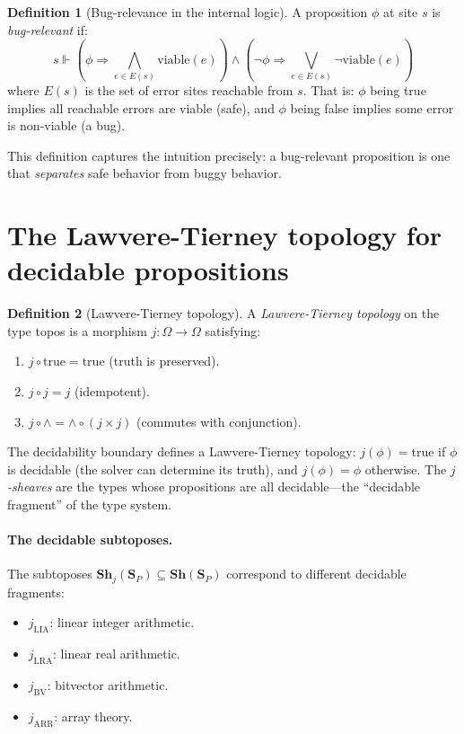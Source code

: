 \documentclass[11pt]{report}
\theoremstyle{definition}
\newtheorem{definition}{Definition}[section]
\theoremstyle{plain}
\begin{document}
\begin{definition}[Bug-relevance in the internal logic]
A proposition $\phi$ at site $s$ is \emph{bug-relevant} if:
\[
  s \Vdash \left(\phi \Rightarrow \bigwedge_{e \in E(s)}
    \mathrm{viable}(e)\right) \wedge \left(\neg\phi \Rightarrow
    \bigvee_{e \in E(s)} \neg\mathrm{viable}(e)\right)
\]
where $E(s)$ is the set of error sites reachable from $s$. That is: $\phi$
being true implies all reachable errors are viable (safe), and $\phi$ being
false implies some error is non-viable (a bug).
\end{definition}

This definition captures the intuition precisely: a bug-relevant proposition
is one that \emph{separates} safe behavior from buggy behavior.

\section{The Lawvere-Tierney topology for decidable propositions}

\begin{definition}[Lawvere-Tierney topology]
A \emph{Lawvere-Tierney topology} on the type topos is a morphism
$j : \Omega \to \Omega$ satisfying:
\begin{enumerate}[nosep]
  \item $j \circ \mathrm{true} = \mathrm{true}$ (truth is preserved).
  \item $j \circ j = j$ (idempotent).
  \item $j \circ \wedge = \wedge \circ (j \times j)$ (commutes with
        conjunction).
\end{enumerate}
\end{definition}

The decidability boundary defines a Lawvere-Tierney topology: $j(\phi) =
\mathrm{true}$ if $\phi$ is decidable (the solver can determine its truth),
and $j(\phi) = \phi$ otherwise. The \emph{$j$-sheaves} are the types whose
propositions are all decidable---the ``decidable fragment'' of the type
system.

\paragraph{The decidable subtoposes.}
The subtoposes $\mathbf{Sh}_j(\mathbf{S}_P) \subseteq
\mathbf{Sh}(\mathbf{S}_P)$ correspond to different decidable fragments:
\begin{itemize}[nosep]
  \item $j_{\mathrm{LIA}}$: linear integer arithmetic.
  \item $j_{\mathrm{LRA}}$: linear real arithmetic.
  \item $j_{\mathrm{BV}}$: bitvector arithmetic.
  \item $j_{\mathrm{ARR}}$: array theory.
\end{itemize}
\end{document}
